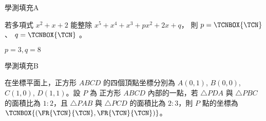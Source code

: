 \begin{QUESTIONS}
    \begin{QUESTION}
        \begin{ExamInfo}{94}{學測}{填充}{A}
        \end{ExamInfo}
        \begin{ExamAnsRateInfo}{69}{92}{82}{33}
        \end{ExamAnsRateInfo}
        \begin{QBODY}
            若多項式 $x^2 +x+2$ 能整除 $x^5 + x^4 +x^3 +px^2 +2x+q$，
			則 $p= \TCNBOX{\TCN}$、 $q=\TCNBOX{\TCN}$ 。
        \end{QBODY}
        \begin{QFROMS}
        \end{QFROMS}
        \begin{QTAGS}\end{QTAGS}
        \begin{QANS}
            $p=3,q=8$
        \end{QANS}
        \begin{QSOLLIST}
        \end{QSOLLIST}
        \begin{QEMPTYSPACE}
        \end{QEMPTYSPACE}
    \end{QUESTION}
    \begin{QUESTION}
        \begin{ExamInfo}{94}{學測}{填充}{B}
        \end{ExamInfo}
        \begin{ExamAnsRateInfo}{39}{78}{34}{5}
        \end{ExamAnsRateInfo}
        \begin{QBODY}
            在坐標平面上，正方形 $ABCD$ 的四個頂點坐標分別為 $A(0,1)$, $B(0,0)$, $C(1,0)$, $D(1,1)$。設 $P$ 為 正方形 $ABCD$ 內部的一點，若 $\triangle PDA$ 與 $\triangle PBC$ 的面積比為 $1:2$，且 $\triangle PAB$ 與 $\triangle PCD$ 的面積比為 $2:3$，則 $P$ 點的坐標為 $\TCNBOX{ (\FR{\TCN}{\TCN}, \FR{\TCN}{\TCN})}$。
        \end{QBODY}
        \begin{QFROMS}
        \end{QFROMS}
        \begin{QTAGS}\end{QTAGS}
        \begin{QANS}

\end{QANS}
\end{QUESTION}
\end{QUESTIONS}
